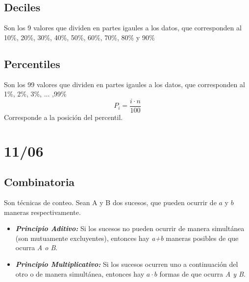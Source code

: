 \documentclass[12pt, letterpaper]{article}
\begin{document}
\subsection{Deciles}
Son los 9 valores que dividen en partes igaules a los datos, que corresponden al 10\%, 20\%, 30\%, 40\%, 50\%, 60\%, 70\%, 80\% y 90\%


\subsection{Percentiles}
Son los 99 valores que dividen en partes igaules a los datos, que corresponden al 1\%, 2\%, 3\%, ... ,99\%
\[ P_i= \frac{i \cdot n}{100} \] Corresponde a la posición del percentil.


\newpage

\section{11/06}
\subsection{Combinatoria} 
Son técnicas de conteo. Sean A y B dos sucesos, que pueden ocurrir de $a$ y $b$ maneras respectivamente.
\begin{itemize}
    \item \textbf{\textit{Principio Aditivo:}} Si los sucesos no pueden ocurrir de manera simultánea (son mutuamente excluyentes), entonces hay \textit{a+b} maneras posibles de que ocurra \textit{A o B}.
    \item \textbf{\textit{Principio Multiplicativo:}} Si los sucesos ocurren uno a continuación del otro o de manera simultánea, entonces hay $a \cdot b$ formas de que ocurra \textit{A y B}.
\end{itemize}
\end{document}
